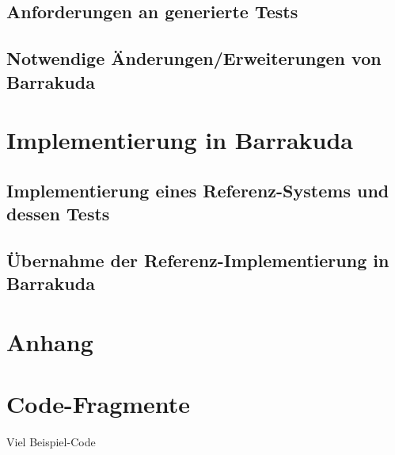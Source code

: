 \documentclass[12pt,a4paper,bibliography=totocnumbered,listof=totocnumbered]{scrartcl}
\begin{document}
\subsection{Anforderungen an generierte Tests}

\subsection{Notwendige Änderungen/Erweiterungen von Barrakuda}

\section{Implementierung in Barrakuda}

\subsection{Implementierung eines Referenz-Systems und dessen Tests}

\subsection{Übernahme der Referenz-Implementierung in Barrakuda}

\renewcommand\refname{Quellenverzeichnis}


\pagebreak

\setcounter{page}{1}

\begin{appendix}
\section*{Anhang}
{}

\section{Code-Fragmente}
Viel Beispiel-Code

\end{appendix}
\end{document}
